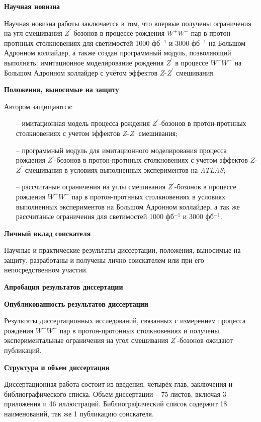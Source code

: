 \textbf{Научная новизна}

Научная новизна работы заключается в том, что впервые получены ограничения на угл смешивания ${Z}^{\prime}$-бозонов в
процессе рождения ${W}^{+}$${W}^{-}$ пар в протон-протнных столкновениях для светимостей 1000 фб${}^{−1}$ и 3000 фб${}^{−1}$ на Большом Адронном коллайдер, а также создан программный модуль, позволяющий выполнять: имитационное моделирование рождения ${Z}^{\prime}$ в процессе ${W}^{+}{W}^{-}$
на Большом Адронном коллайдер с учётом эффектов $Z$-${Z}^{\prime}$ смешивания.

\textbf{Положения, выносимые на защиту}

Автором защищаются:
\begin{itemize}
	\item[--] имитационная модель процесса рождения ${Z}^{\prime}$-бозонов в протон-протнных столкновениях с учетом эффектов $Z$-${Z}^{\prime}$ смешивания;
	
	\item[--] программный модуль для имитационного моделирования процесса
	рождения ${Z}^{\prime}$-бозонов в протон-протнных столкновениях с учетом эффектов $Z$-${Z}^{\prime}$ смешивания в условиях
	выполненных экспериментов на \textit{ATLAS};
	
	\item[--] рассчитаные ограничения на углы смешивания ${Z}^{\prime}$-бозонов в
	процессе рождения ${W}^{+}$${W}^{-}$ пар в протон-протнных столкновениях
	в условиях выполненных экспериментов на Большом Адронном коллайдер, а так же рассчитаные ограничения для светимостей 1000 фб${}^{−1}$ и 3000 фб${}^{−1}$.
	
\end{itemize}

\textbf{Личный вклад соискателя}

Научные и практические результаты диссертации, положения, выносимые на защиту, разработаны и получены лично соискателем или при его непосредственном участии.

\textbf{Апробация результатов диссертации}



\textbf{Опубликованность результатов диссертации}

Результаты диссертационных исследований, связанных с измерением процесса рождения ${W}^{+}{W}^{-}$ пар в протон-протонных столкновениях и получены экспериментальные ограничения на угол смешивания ${Z}^{\prime}$-бозонов  ожидают публикаций.

\textbf{Структура и объем диссертации}

Диссертационная работа состоит из введения, четырёх глав, заключения и библиографического списка. Объем диссертации – 75 листов, включая 3 приложения и 46 иллюстраций. Библиографический список содержит 18 наименований, так же 1 публикацию соискателя.

